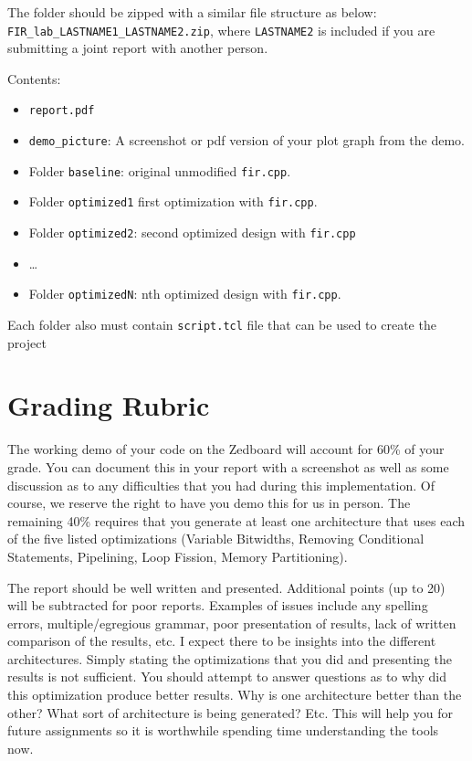 The folder should be zipped with a similar file structure as below:
\texttt{FIR\_lab\_LASTNAME1\_LASTNAME2.zip}, where \texttt{LASTNAME2} is included if you are submitting a joint report with another person.

Contents:
\begin{itemize}
\item \texttt{report.pdf}
\item \texttt{demo\_picture}: A screenshot or pdf version of your plot graph from the demo.
\item Folder \texttt{baseline}: original unmodified \texttt{fir.cpp}.
\item Folder \texttt{optimized1} first optimization with \texttt{fir.cpp}.
\item Folder \texttt{optimized2}: second optimized design with \texttt{fir.cpp}
\item \dots
\item Folder \texttt{optimizedN}: nth optimized design with \texttt{fir.cpp}.
\end{itemize}
Each folder also must contain \texttt{script.tcl} file that can be used to create the project

\section{Grading Rubric}
The working demo of your code on the Zedboard will account for 60\% of your grade. You can document this in your report with a screenshot as well as some discussion as to any difficulties that you had during this implementation. Of course, we reserve the right to have you demo this for us in person. The remaining 40\% requires that you generate at least one architecture that uses each of the five listed optimizations (Variable Bitwidths, Removing Conditional Statements, Pipelining, Loop Fission, Memory Partitioning). 

The report should be well written and presented. Additional points (up to 20) will be subtracted for poor reports. Examples of issues include any spelling errors, multiple/egregious grammar, poor presentation of results, lack of written comparison of the results, etc. I expect there to be insights into the different architectures. Simply stating the optimizations that you did and presenting the results is not sufficient. You should attempt to answer questions as to why did this optimization produce better results. Why is one architecture better than the other? What sort of architecture is being generated? Etc. This will help you for future assignments so it is worthwhile spending time understanding the tools now.
